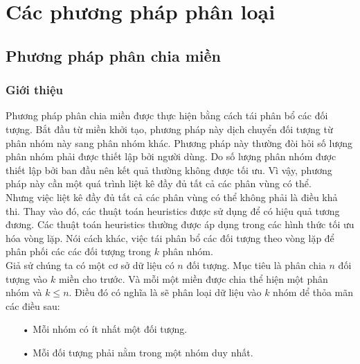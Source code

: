 \chapter{Các phương pháp phân loại}
\label{Chapter2}

\section{Phương pháp phân chia miền}
\subsection{Giới thiệu}
\hspace{10mm}Phương pháp phân chia miền được thực hiện bằng cách tái phân bổ các đối tượng. Bắt đầu từ miền khởi tạo, phương pháp này dịch chuyển đối tượng từ phân nhóm này sang phân nhóm khác. Phương pháp này thường đòi hỏi số lượng phân nhóm phải được thiết lập bởi người dùng. Do số lượng phân nhóm được thiết lập bởi ban đầu nên kết quả thường không được tối ưu. Vì vậy, phương pháp này cần một quá trình liệt kê đầy đủ tất cả các phân vùng có thể. \\
\hspace*{10mm}Nhưng việc liệt kê đầy đủ tất cả các phân vùng có thể không phải là điều khả thi. Thay vào đó, các thuật toán heuristics được sử dụng để có hiệu quả tương đương. Các thuật toán heuristics thường được áp dụng trong các hình thức tối ưu hóa vòng lặp. Nói cách khác, việc tái phân bổ các đối tượng theo vòng lặp để phân phối các các đối tượng trong $k$ phân nhóm.\\
\hspace*{10mm}Giả sử chúng ta có một cơ sở dữ liệu có $n$ đối tượng.  Mục tiêu là phân chia $n$ đối tượng vào $k$ miền cho trước. Và mỗi một miền được chia thể hiện một phân nhóm và $k \leq n$. Điều đó có nghĩa là sẽ phân loại dữ liệu vào $k$ nhóm dể thỏa mãn các điều sau:\\
\begin{enumerate}
\vspace{-10mm}
\item[•]Mỗi nhóm có ít nhất một đối tượng.
\item[•]Mỗi đối tượng phải nằm trong một nhóm duy nhất.
\end{enumerate}

